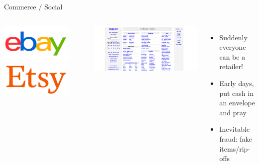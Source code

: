 \documentclass[nobackground,dvipsnames,table,aspectratio=169]{beamer}
\begin{document}
\begin{frame}{Commerce / Social}
    \begin{columns}
        \centering
            \centering
            \begin{columns}
                    \centering
                    \includegraphics[width=0.8\textwidth]{ebay}
                    \centering
                    \includegraphics[width=0.8\textwidth]{etsy}
            \end{columns}
            \includegraphics[width=\textwidth]{craigslist}
            \begin{itemize}
                \item Suddenly everyone can be a retailer!
                \item Early days, put cash in an envelope and pray
                \item Inevitable fraud: fake items/rip-offs
            \end{itemize}
    \end{columns}
\end{frame}
\end{document}
